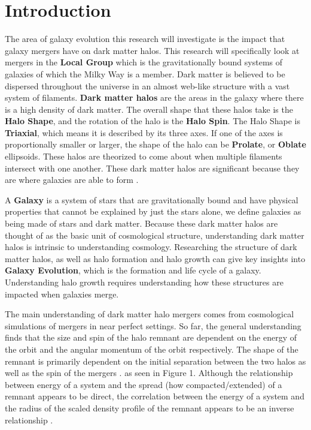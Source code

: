 \documentclass[linenumbers,trackchanges]{aastex7}
\begin{document}
\section{Introduction} 

The area of galaxy evolution this research will investigate is the impact that galaxy mergers have on dark matter halos. This research will specifically look at mergers in the \textbf{Local Group} which is the gravitationally bound systems of galaxies of which the Milky Way is a member. Dark matter is believed to be dispersed throughout the universe in an almost web-like structure with a vast system of filaments. \textbf{Dark matter halos} are the areas in the galaxy where there is a high density of dark matter. The overall shape that these halos take is the \textbf{Halo Shape}, and the rotation of the halo is the \textbf{Halo Spin}. The Halo Shape is \textbf{Triaxial}, which means it is described by its three axes. If one of the axes is proportionally smaller or larger, the shape of the halo can be \textbf{Prolate}, or \textbf{Oblate} ellipsoids. These halos are theorized to come about when multiple filaments intersect with one another. These dark matter halos are significant because they are where galaxies are able to form \cite{Frenk_2012}. 

A \textbf{Galaxy} is a system of stars that are gravitationally bound and have physical properties that cannot be explained by just the stars alone, we define galaxies as being made of stars and dark matter. Because these dark matter halos are thought of as the basic unit of cosmological structure, understanding dark matter halos is intrinsic to understanding cosmology. Researching the structure of dark matter halos, as well as halo formation and halo growth can give key insights into \textbf{Galaxy Evolution}, which is the formation and life cycle of a galaxy. Understanding halo growth requires understanding how these structures are impacted when galaxies merge. 

The main understanding of dark matter halo mergers comes from cosmological simulations of mergers in near perfect settings. So far, the general understanding finds that the size  and spin of the halo remnant are dependent on the energy of the orbit and the angular momentum of the orbit respectively. The shape of the remnant is primarily dependent on the initial separation between the two halos as well as the spin of the mergers \cite{2019MNRAS.487..993D}. as seen in Figure 1. Although the relationship between energy of a system and the spread (how compacted/extended) of a remnant appears to be direct, the correlation between the energy of a system and the radius of the scaled density profile of the remnant appears to be an inverse relationship \cite{2019MNRAS.487.1008D}.
\end{document}

